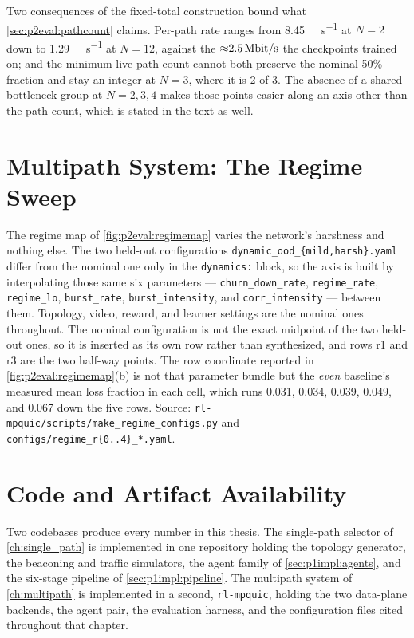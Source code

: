 Two consequences of the fixed-total construction bound what \cref{sec:p2eval:pathcount} claims. Per-path
rate ranges from \SI{8.45}{\mega\bit\per\second} at $N = 2$ down to \SI{1.29}{\mega\bit\per\second} at
$N = 12$, against the ${\approx}\SI{2.5}{\mega\bit\per\second}$ the checkpoints trained on; and the
minimum-live-path count cannot both preserve the nominal 50\% fraction and stay an integer at $N = 3$,
where it is 2 of 3. The absence of a shared-bottleneck group at $N = 2, 3, 4$ makes those points easier
along an axis other than the path count, which is stated in the text as well.

\section{Multipath System: The Regime Sweep}
\label{app:p2regimes}

The regime map of \cref{fig:p2eval:regimemap} varies the network's harshness and nothing else. The two
held-out configurations \texttt{dynamic\_ood\_\{mild,harsh\}.yaml} differ from the nominal one only in
the \texttt{dynamics:} block, so the axis is built by interpolating those same six parameters ---
\texttt{churn\_down\_rate}, \texttt{regime\_rate}, \texttt{regime\_lo}, \texttt{burst\_rate},
\texttt{burst\_intensity}, and \texttt{corr\_intensity} --- between them. Topology, video, reward, and
learner settings are the nominal ones throughout. The nominal configuration is not the exact midpoint of
the two held-out ones, so it is inserted as its own row rather than synthesized, and rows r1 and r3 are
the two half-way points. The row coordinate reported in \cref{fig:p2eval:regimemap}(b) is not that
parameter bundle but the \emph{even} baseline's measured mean loss fraction in each cell, which runs
0.031, 0.034, 0.039, 0.049, and 0.067 down the five rows. Source:
\texttt{rl-mpquic/\allowbreak scripts/\allowbreak make\_regime\_configs.py} and
\texttt{configs/\allowbreak regime\_r\{0..4\}\_*.yaml}.

\section{Code and Artifact Availability}
\label{app:artifacts}

Two codebases produce every number in this thesis. The single-path selector of \cref{ch:single_path} is
implemented in one repository holding the topology generator, the beaconing and traffic simulators, the
agent family of \cref{sec:p1impl:agents}, and the six-stage pipeline of \cref{sec:p1impl:pipeline}. The
multipath system of \cref{ch:multipath} is implemented in a second, \texttt{rl-mpquic}, holding the two
data-plane backends, the agent pair, the evaluation harness, and the configuration files cited
throughout that chapter.

